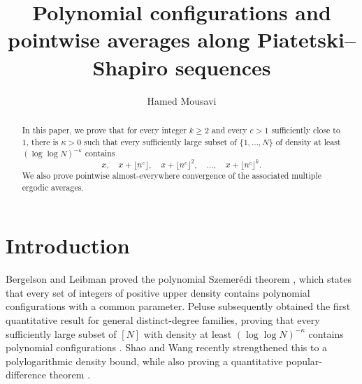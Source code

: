\documentclass{amsart}
\title{Polynomial configurations and pointwise averages
along Piatetski--Shapiro sequences}
\author[H. MOUSAVI]{Hamed Mousavi}
\date{}
\newcommand{\1}{\mathbf 1}
\begin{document}
\begin{abstract}
In this paper, we prove that for every integer $k\geq2$ and every
$c>1$ sufficiently close to $1$, there is $\kappa>0$ such that every
sufficiently large subset of $\{1,\ldots,N\}$ of density at least
$(\log\log N)^{-\kappa}$ contains
\[
 x,\quad x+\lfloor n^c\rfloor,\quad x+\lfloor n^c\rfloor^2,
 \quad\ldots,\quad x+\lfloor n^c\rfloor^k.
\]
We also prove pointwise almost-everywhere convergence of the associated multiple ergodic averages.
\end{abstract}

\maketitle
\pagestyle{plain}

\section{Introduction}


Bergelson and Leibman proved the polynomial Szemer\'edi theorem
\cite{BergelsonLeibman}, which states that every set of integers of positive upper density contains polynomial configurations with a common parameter. Peluse subsequently obtained the first quantitative result for general distinct-degree families, proving that every sufficiently large subset of \([N]\) with density at least \((\log\log N)^{-\kappa}\) contains polynomial configurations \cite{Peluse}. Shao and Wang recently strengthened this to a polylogarithmic density bound, while also proving a quantitative popular-difference theorem \cite[Theorems~1.1 and~1.2]{ShaoWang}.
\end{document}
